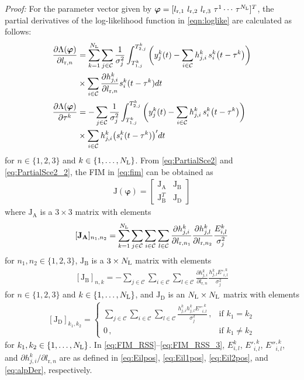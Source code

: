 \documentclass[10pt,twocolumn]{IEEEtran}
\newcommand{\NL}{N_{\rm{L}}}
\newcommand{\bvp}{{\boldsymbol{\varphi}}}
\newcommand{\mtC}{{\mathcal{C}}}
\newcommand{\lrs}[1]{{l_{\mathrm{r},#1}}}
\newcommand{\Jv}{{\boldsymbol{\mathrm{J}}(\bvp)}}
\newcommand{\JA}{{\boldsymbol{\mathrm{J_A}}}}
\newcommand{\JB}{{\boldsymbol{\mathrm{J_B}}}}
\newcommand{\JBT}{{\boldsymbol{\mathrm{J}}}_{\boldsymbol{\mathrm{B}}}^{T}}
\newcommand{\JD}{{\boldsymbol{\mathrm{J_D}}}}
\begin{document}
\indent\indent\textit{Proof:} For the parameter vector given by $\bvp=[\lrs{1}~\lrs{2}~\lrs{3}~\tau^1\cdots\,\tau^{\NL}]^T$, the partial derivatives of the log-likelihood function in \eqref{eqn:loglike} are calculated as follows:
\begin{align}\nonumber
\frac{\partial\Lambda(\bvp)}{\partial\lrs{n}}&=\sum_{k=1}^{\NL}\sum_{j\in{\mtC}} \frac{1}{\sigma_j^2} \int_{T^k_{1,j}}^{T^k_{2,j}}
\bigg(y^k_j(t)-\sum_{i\in{\mtC}}h^k_{j,i}\,s^k_i\big(t-\tau^k\big)\bigg)\\\label{eq:PartialSce2}
&\times\sum_{i\in{\mtC}}\frac{{\partial h^k_{j,i}}}{{\partial \lrs{n}}} s^k_i(t - \tau^k) dt \\\nonumber
\frac{\partial\Lambda(\bvp)}{\partial\tau^k}&=-\sum_{j\in{\mtC}} \frac{1}{\sigma_j^2} \int_{T^k_{1,j}}^{T^k_{2,j}}
\bigg(y^k_j(t)-\sum_{i\in{\mtC}}h^k_{j,i}\,s^k_i\big(t-\tau^k\big)\bigg)\\\label{eq:PartialSce2_2}
&\times\sum_{i\in{\mtC}}h^k_{j,i} \big(s^k_i(t - \tau^k)\big)' dt
\end{align}
for $n\in\{1,2,3\}$ and $k\in\{1,\ldots,\NL\}$. From \eqref{eq:PartialSce2} and \eqref{eq:PartialSce2_2}, the FIM in \eqref{eq:fim} can be obtained as
\begin{gather}\label{eq:blockMat}
	\Jv=\begin{bmatrix}
		\JA&\JB\\\JBT&\JD
	\end{bmatrix}
\end{gather}
where $\JA$ is a $3\times3$ matrix with elements
\begin{align}\label{eq:FIM_RSS}
	[\JA]_{n_1,n_2} = \sum_{k=1}^{\NL}\sum_{j\in{\mtC}}\sum_{i\in{\mtC}}
\sum_{l\in{\mtC}}\frac{\partial h^k_{j,i}}{\partial \lrs{n_1}}\frac{\partial h^k_{j,l}}{\partial \lrs{n_2}}\frac{E^k_{i,l}}{\sigma_j^2}
\end{align}
for $n_1, n_2 \in \{1, 2, 3 \}$, $\JB$ is a $3\times\NL$ matrix with elements
\begin{align}\label{eq:FIM_RSS_2}
	[\JB]_{n,k} = -\sum_{j\in{\mtC}}\sum_{i\in{\mtC}}\sum_{l\in{\mtC}}\frac{\partial h^k_{j,i}}{\partial \lrs{n}}\frac{h^k_{j,l}E'^{,k}_{i,l}}{\sigma_j^2}
\end{align}
for $n \in \{1, 2, 3 \}$ and $k \in \{1, \ldots ,\NL\}$, and $\JD$ is an $\NL\times\NL$ matrix with elements
\begin{align}\label{eq:FIM_RSS_3}
	[\JD]_{k_1,k_2} = \begin{cases}
		\sum_{j\in{\mtC}}\sum_{i\in{\mtC}}\sum_{l\in{\mtC}}
\frac{h^k_{j,i}h^k_{j,l}E''^{,k}_{i,l}}{\sigma_j^2}\,, &{\textrm{if }}k_1=k_2\\
		0\,,&{\textrm{if }}k_1\ne k_2
	\end{cases}
\end{align}
for $k_1, k_2 \in \{1,\ldots ,\NL\}$. In \eqref{eq:FIM_RSS}--\eqref{eq:FIM_RSS_3}, $E^k_{i,l}$, $E'^{,k}_{i,l}$, $E''^{,k}_{i,l}$, and ${\partial h^k_{j,i}}/{\partial \lrs{n}}$ are as defined in \eqref{eq:Eilpos}, \eqref{eq:Eil1pos}, \eqref{eq:Eil2pos}, and \eqref{eq:alpDer}, respectively.
\end{document}

